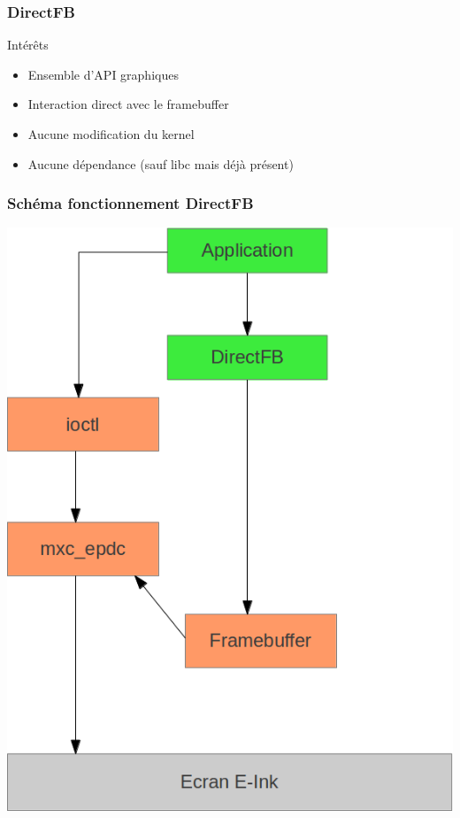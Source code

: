 \begin{frame}
\frametitle{DirectFB}

\begin{block}{Intérêts}
\begin{itemize}
\item Ensemble d'API graphiques
\item Interaction direct avec le framebuffer 
\item Aucune modification du kernel
\item Aucune dépendance (sauf libc mais déjà présent)
\end{itemize}
\end{block}

\end{frame}

\begin{frame}
\frametitle{Schéma fonctionnement DirectFB}

\begin{center}
\includegraphics[scale=0.3]{schema_direct_fb.png}
\end{center}

\end{frame}

